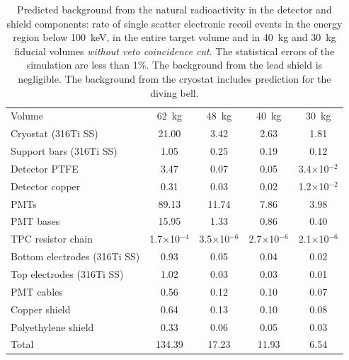 \begin{table}[!t]
\centering
\caption[Predicted background due to natural radioactivity in the detector and shield components  without veto coincidence cut]{Predicted background from the natural radioactivity in the detector and shield components: rate of single scatter electronic recoil events in the energy region below 100~keV, in the entire target volume and in 40~kg and 30~kg fiducial volumes {\it without veto coincidence cut}. The statistical errors of the simulation are less than 1\%. The background from the lead shield is negligible. The background from the cryostat includes prediction for the diving bell.}
\label{tabPredictedGammaPassiveVeto}
\begin{tabular}{>{\footnotesize}l |>{\footnotesize} c |>{\footnotesize} c |>{\footnotesize} c |>{\footnotesize} c}
\hline
& \multicolumn{4}{>{\footnotesize}c}{Single electronic recoils [$\times$10$^{-3}$~events$\cdot$kg$^{-1}$$\cdot$day$^{-1}$$\cdot$keV$^{-1}$]}\\
\hline
Volume  & 62~kg & 48~kg & 40~kg  & 30~kg \\
\hline
Cryostat  (316Ti SS) 				& 21.00	& 3.42	& 2.63	 	& 1.81	 \\
Support bars (316Ti SS)			& 1.05 	& 0.25	& 0.19	 	& 0.12	 \\
Detector PTFE 					& 3.47 	& 0.07	& 0.05 	 	& 3.4$\times$10$^{-2}$	 \\
Detector copper 				& 0.31  	& 0.03	& 0.02		 & 1.2$\times$10$^{-2}$  \\
PMTs 						& 89.13	& 11.74	& 7.86	 	& 3.98	 \\
PMT bases	 				& 15.95	& 1.33	& 0.86	 	& 0.40 	 \\
TPC resistor chain 				& 1.7$\times$10$^{-4}$ & 3.5$\times$10$^{-6}$  &  2.7$\times$10$^{-6}$  & 2.1$\times$10$^{-6}$ 	 \\
Bottom electrodes (316Ti SS) 		& 0.93 	& 0.05	& 0.04	 	& 0.02 	 \\
Top electrodes (316Ti SS) 		& 1.02 	& 0.03	& 0.03	 	& 0.01 	 \\
PMT cables 					& 0.56	& 0.12	& 0.10	 	& 0.07 	 \\
Copper shield					& 0.64   	& 0.13	& 0.10	 	& 0.08 	 \\
Polyethylene shield				& 0.33   	& 0.06	& 0.05	 	& 0.03 	 \\
\hline
Total 						& 134.39  	& 17.23  	&11.93  	 	& 6.54 	 \\
\hline
\end{tabular}
\end{table}

